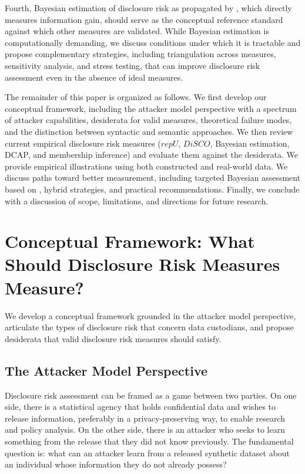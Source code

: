 \documentclass[Afour,sageh,times,doublespace]{sagej}
\begin{document}
Fourth, Bayesian estimation of disclosure risk as propagated by \citet{reiter2005, reiter2005using,reiter2014}, which directly measures information gain, should serve as the conceptual reference standard against which other measures are validated. While Bayesian estimation is computationally demanding, we discuss conditions under which it is tractable and propose complementary strategies, including triangulation across measures, sensitivity analysis, and stress testing, that can improve disclosure risk assessment even in the absence of ideal measures.

The remainder of this paper is organized as follows. We first develop our conceptual framework, including the attacker model perspective with a spectrum of attacker capabilities, desiderata for valid measures, theoretical failure modes, and the distinction between syntactic and semantic approaches. We then review current empirical disclosure risk measures ($repU$, $DiSCO$, Bayesian estimation, DCAP, and membership inference) and evaluate them against the desiderata. We provide empirical illustrations using both constructed and real-world data. We discuss paths toward better measurement, including targeted Bayesian assessment based on \citet{reiter2014}, hybrid strategies, and practical recommendations. Finally, we conclude with a discussion of scope, limitations, and directions for future research.




\section{Conceptual Framework: What Should Disclosure Risk Measures Measure?}
\label{sec:framework}

We develop a conceptual framework grounded in the attacker model perspective, articulate the types of disclosure risk that concern data custodians, and propose desiderata that valid disclosure risk measures should satisfy.

\subsection{The Attacker Model Perspective}

Disclosure risk assessment can be framed as a game between two parties. On one side, there is a statistical agency that holds confidential data and wishes to release information, preferably in a privacy-preserving way, to enable research and policy analysis. On the other side, there is an attacker who seeks to learn something from the release that they did not know previously. The fundamental question is: what can an attacker learn from a released synthetic dataset about an individual whose information they do not already possess?
\end{document}
